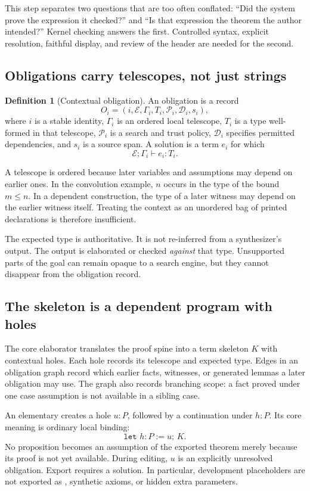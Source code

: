 \documentclass[11pt,letterpaper]{article}
\theoremstyle{definition}
\newtheorem{definition}[proposition]{Definition}
\theoremstyle{remark}
\newcommand{\code}[1]{\texttt{\detokenize{#1}}}
\begin{document}
This step separates two questions that are too often conflated: ``Did the system prove the expression it checked?'' and ``Is that expression the theorem the author intended?'' Kernel checking answers the first. Controlled syntax, explicit resolution, faithful display, and review of the header are needed for the second.

\subsection{Obligations carry telescopes, not just strings}
\begin{definition}[Contextual obligation]
An obligation is a record
\[
 O_i=(i,\mathcal E,\Gamma_i,T_i,\mathcal P_i,\mathcal D_i,s_i),
\]
where $i$ is a stable identity, $\Gamma_i$ is an ordered local telescope, $T_i$ is a type well-formed in that telescope, $\mathcal P_i$ is a search and trust policy, $\mathcal D_i$ specifies permitted dependencies, and $s_i$ is a source span. A solution is a term $e_i$ for which
\[
 \mathcal E;\Gamma_i\vdash e_i:T_i.
\]
\end{definition}
A telescope is ordered because later variables and assumptions may depend on earlier ones. In the convolution example, $n$ occurs in the type of the bound $m\le n$. In a dependent construction, the type of a later witness may depend on the earlier witness itself. Treating the context as an unordered bag of printed declarations is therefore insufficient.

The expected type is authoritative. It is not re-inferred from a synthesizer's output. The output is elaborated or checked \emph{against} that type. Unsupported parts of the goal can remain opaque to a search engine, but they cannot disappear from the obligation record.

\subsection{The skeleton is a dependent program with holes}
The core elaborator translates the proof spine into a term skeleton $K$ with contextual holes. Each hole records its telescope and expected type. Edges in an obligation graph record which earlier facts, witnesses, or generated lemmas a later obligation may use. The graph also records branching scope: a fact proved under one case assumption is not available in a sibling case.

An elementary \code{fact h : P by m} creates a hole $u:P$, followed by a continuation under $h:P$. Its core meaning is ordinary local binding:
\[
 \texttt{let }h:P:=u\texttt{; }K.
\]
No proposition becomes an assumption of the exported theorem merely because its proof is not yet available. During editing, $u$ is an explicitly unresolved obligation. Export requires a solution. In particular, development placeholders are not exported as \code{sorry}, synthetic axioms, or hidden extra parameters.
\end{document}
